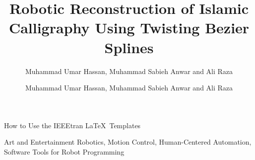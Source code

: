 \documentclass[lettersize,journal,onecolumn]{IEEEtran}
\begin{document}
\title{Robotic Reconstruction of Islamic Calligraphy Using Twisting Bezier Splines}
\author{Muhammad Umar Hassan, Muhammad Sabieh Anwar and Ali Raza
}

%
{How to Use the IEEEtran \LaTeX \ Templates}

\maketitle

\author{Muhammad Umar Hassan, Muhammad Sabieh Anwar and Ali Raza}
    
    \begin{IEEEkeywords}
    Art and Entertainment Robotics, Motion Control, Human-Centered Automation, Software Tools for Robot Programming
    \end{IEEEkeywords}
    
    
    
    
\end{document}
